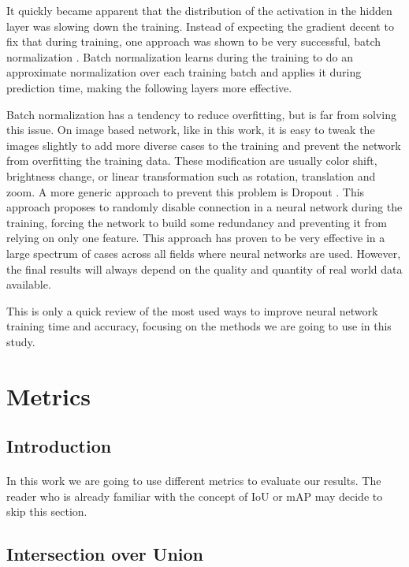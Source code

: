 It quickly became apparent that the distribution of the activation in the hidden layer was slowing down the training. Instead of expecting the gradient decent to fix that during training, one approach was shown to be very successful, batch normalization \cite{ioffe2015batch}. Batch normalization learns during the training to do an approximate normalization over each training batch and applies it during prediction time, making the following layers more effective.

Batch normalization has a tendency to reduce overfitting, but is far from solving this issue. On image based network, like in this work, it is easy to tweak the images slightly to add more diverse cases to the training and prevent the network from overfitting the training data. These modification are usually color shift, brightness change, or linear transformation such as rotation, translation and zoom. A more generic approach to prevent this problem is Dropout \cite{srivastava2014dropout}. This approach proposes to randomly disable connection in a neural network during the training, forcing the network to build some redundancy and preventing it from relying on only one feature. This approach has proven to be very effective in a large spectrum of cases across all fields where neural networks are used. However, the final results will always depend on the quality and quantity of real world data available.

This is only a quick review of the most used ways to improve neural network training time and accuracy, focusing on the methods we are going to use in this study.

\section{Metrics}
\subsection{Introduction}
\paragraph{}
In this work we are going to use different metrics to evaluate our results. The reader who is already familiar with the concept of IoU or mAP may decide to skip this section.

\subsection{Intersection over Union}
